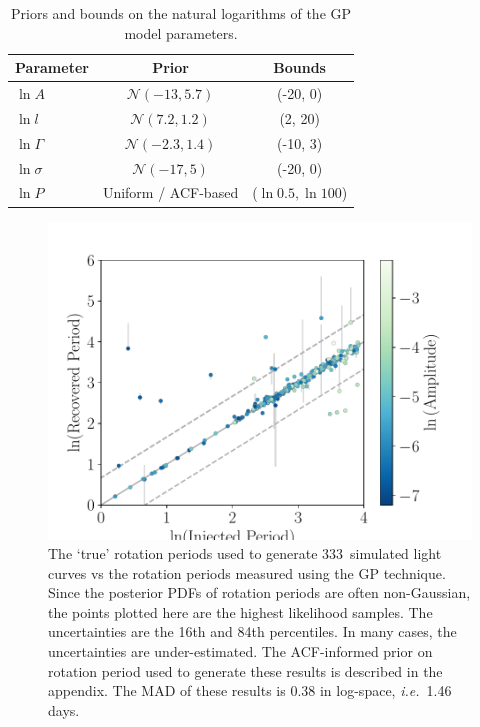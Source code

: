 \documentclass[useAMS, usenatbib, preprint, 12pt]{aastex}
\newcommand{\ie}{{\it i.e.}}
\newcommand{\naigrain}{333}
\begin{document}
\begin{table}
\begin{center}
\caption{Priors and bounds on the natural logarithms of the GP model
    parameters.}
\begin{tabular}{lcc}
Parameter & Prior & Bounds\\
    \hline
    $\ln A$ & $\mathcal N(-13, 5.7)$ & (-20, 0) \\
    $\ln l$ & $\mathcal N(7.2, 1.2)$ & (2, 20) \\
    $\ln \Gamma$ & $\mathcal N(-2.3, 1.4)$ & (-10, 3) \\
    $\ln \sigma$ & $\mathcal N(-17, 5)$ & (-20, 0) \\
    $\ln P $ & Uniform / ACF-based & ($\ln 0.5, \ln 100$) \\
\end{tabular}
\end{center}
\end{table}
\label{tab:priors}

\begin{figure}
\begin{center}
\includegraphics[width=6in, clip=true]{figures/comparison_acfprior_02_13.pdf}
\caption{The `true' rotation periods used to generate \naigrain\
simulated light curves vs the rotation periods measured using the GP
technique.
Since the posterior PDFs of rotation periods are often non-Gaussian,
the points plotted here are the highest likelihood samples.
The uncertainties are the 16th and 84th percentiles.
In many cases, the uncertainties are under-estimated.
The ACF-informed prior on rotation period used to generate these results is
    described in the appendix.
The MAD of these results is 0.38 in log-space, \ie\ 1.46 days.
    }
\label{fig:compare_mcmc_acfprior}
\end{center}
\end{figure}
\end{document}
